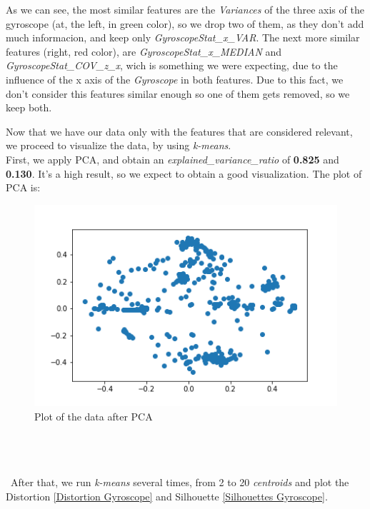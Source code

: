 \documentclass[idxtotoc,hyperref,openany]{labbook} %
\begin{document}
As we can see, the most similar features are the \textit{Variances} of the three axis of the gyroscope (at, the left, in green color), so we drop two of them, as they don't add much informacion, and keep only \textit{GyroscopeStat\_x\_VAR}. 
The next more similar features (right, red color), are \textit{GyroscopeStat\_x\_MEDIAN} and \textit{GyroscopeStat\_COV\_z\_x}, wich is something we were expecting, due to the influence of the x axis of the \textit{Gyroscope} in both features. Due to this fact, we don't consider this features similar enough so one of them gets removed, so we keep both.

\clearpage
Now that we have our data only with the features that are considered relevant, we proceed to visualize the data, by using \textit{k-means}.\\

First, we apply PCA, and obtain an \textit{explained\_variance\_ratio} of \textbf{0.825} and \textbf{0.130}. It's a high result, so we expect to obtain a good visualization. The plot of PCA is:

\begin{figure}[h]
\includegraphics[width=0.9\linewidth]{2710/PCA_Plot_Gyroscope.png}
\setlength\belowcaptionskip{-10pt}
\caption{Plot of the data after PCA}
\label{Plot Gyroscope}
\end{figure}  

\textit{  }\\\\\\\
After that, we run \textit{k-means} several times, from 2 to 20 \textit{centroids} and plot the Distortion \ref{Distortion Gyroscope} and Silhouette \ref{Silhouettes Gyroscope}.
\end{document}
